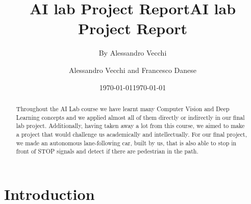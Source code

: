 \documentclass[12pt,a4paper]{article}
\title{AI lab Project Report}
\date{\today}
\author{By Alessandro Vecchi}
\begin{document}
\title{\textbf{AI lab Project Report}}
\author{Alessandro Vecchi and Francesco Danese}
\date{\today}
\maketitle


\begin{abstract}

\begin{addmargin}[3em]{1em}
\centering
Throughout the AI Lab course we have learnt many Computer Vision and Deep Learning concepts and we applied almost all of them directly or indirectly in our final lab project. Additionally, having taken away a lot from this course, we aimed to make a project that would challenge us academically and intellectually. For our final project, we made an autonomous lane-following car, built by us, that is also able to stop in front of STOP signals and detect if there are pedestrian in the path.
\end{addmargin}

\end{abstract}

\section{Introduction}
\end{document}
